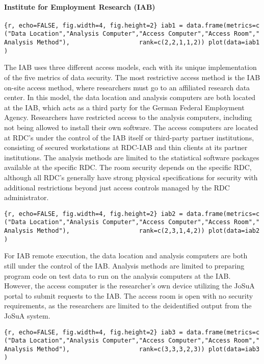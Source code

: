 \hypertarget{institute-for-employment-research-iab}{%
\paragraph{Institute for Employment Research
(IAB)}\label{institute-for-employment-research-iab}}

\texttt{\{r,\ echo=FALSE,\ fig.width=4,\ fig.height=2\}\ iab1\ =\ data.frame(metrics=c("Data\ Location","Analysis\ Computer","Access\ Computer","Access\ Room","Analysis\ Method"),\ \ \ \ \ \ \ \ \ \ \ \ \ \ \ \ \ \ \ rank=c(2,2,1,1,2))\ plot(data=iab1)}

The IAB uses three different access models, each with its unique
implementation of the five metrics of data security. The most
restrictive access method is the IAB on-site access method, where
researchers must go to an affiliated research data center. In this
model, the data location and analysis computers are both located at the
IAB, which acts as a third party for the German Federal Employment
Agency. Researchers have restricted access to the analysis computers,
including not being allowed to install their own software. The access
computers are located at RDC's under the control of the IAB itself or
third-party partner institutions, consisting of secured workstations at
RDC-IAB and thin clients at its partner institutions. The analysis
methods are limited to the statistical software packages available at
the specific RDC. The room security depends on the specific RDC,
although all RDC's generally have strong physical specifications for
security with additional restrictions beyond just access controls
managed by the RDC administrator.

\texttt{\{r,\ echo=FALSE,\ fig.width=4,\ fig.height=2\}\ iab2\ =\ data.frame(metrics=c("Data\ Location","Analysis\ Computer","Access\ Computer","Access\ Room","Analysis\ Method"),\ \ \ \ \ \ \ \ \ \ \ \ \ \ \ \ \ \ \ rank=c(2,3,1,4,2))\ plot(data=iab2)}

For IAB remote execution, the data location and analysis computers are
both still under the control of the IAB. Analysis methods are limited to
preparing program code on test data to run on the analysis computers at
the IAB. However, the access computer is the researcher's own device
utilizing the JoSuA portal to submit requests to the IAB. The access
room is open with no security requirements, as the researchers are
limited to the deidentified output from the JoSuA system.

\texttt{\{r,\ echo=FALSE,\ fig.width=4,\ fig.height=2\}\ iab3\ =\ data.frame(metrics=c("Data\ Location","Analysis\ Computer","Access\ Computer","Access\ Room","Analysis\ Method"),\ \ \ \ \ \ \ \ \ \ \ \ \ \ \ \ \ \ \ rank=c(3,3,3,2,3))\ plot(data=iab3)}


